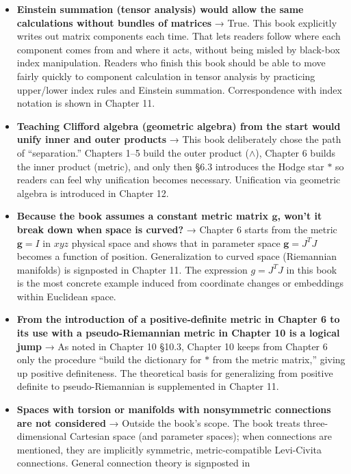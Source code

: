\documentclass[a4paper,12pt,openany]{book}
\begin{document}
\begin{itemize}
\item
  \textbf{Einstein summation (tensor analysis) would allow the same calculations without bundles of matrices}
  → True. This book explicitly writes out matrix components each time.
  That lets readers follow where each component comes from and where it
  acts, without being misled by black-box index manipulation. Readers
  who finish this book should be able to move fairly quickly to
  component calculation in tensor analysis by practicing upper/lower
  index rules and Einstein summation. Correspondence with index notation
  is shown in Chapter 11.
\item
  \textbf{Teaching Clifford algebra (geometric algebra) from the start would unify inner and outer products}
  → This book deliberately chose the path of ``separation.'' Chapters
  1–5 build the outer product (\(\wedge\)), Chapter 6 builds the inner
  product (metric), and only then §6.3 introduces the Hodge star
  \(\ast\) so readers can feel why unification becomes necessary.
  Unification via geometric algebra is introduced in Chapter 12.
\item
  \textbf{Because the book assumes a constant metric matrix $\mathbf{g}$, won't it break down when space is curved?}
  → Chapter 6 starts from the metric \(\mathbf{g}=I\) in \(xyz\)
  physical space and shows that in parameter space \(\mathbf{g}=J^T J\)
  becomes a function of position. Generalization to curved space
  (Riemannian manifolds) is signposted in Chapter 11. The expression
  \(g=J^T J\) in this book is the most concrete example induced from
  coordinate changes or embeddings within Euclidean space.
\item
  \textbf{From the introduction of a positive-definite metric in Chapter 6 to its use with a pseudo-Riemannian metric in Chapter 10 is a logical jump}
  → As noted in Chapter 10 §10.3, Chapter 10 keeps from Chapter 6 only
  the procedure ``build the dictionary for \(\ast\) from the metric
  matrix,'' giving up positive definiteness. The theoretical basis for
  generalizing from positive definite to pseudo-Riemannian is
  supplemented in Chapter 11.
\item
  \textbf{Spaces with torsion or manifolds with nonsymmetric connections are not considered}
  → Outside the book's scope. The book treats three-dimensional
  Cartesian space (and parameter spaces); when connections are
  mentioned, they are implicitly symmetric, metric-compatible
  Levi-Civita connections. General connection theory is signposted in

\end{itemize}
\end{document}
